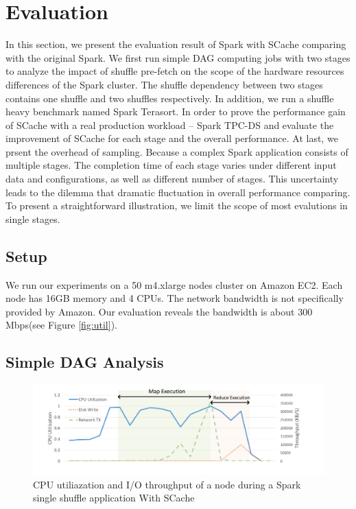 \section{Evaluation}\label{evaluation}

In this section, we present the evaluation result of Spark with SCache comparing with the original Spark. We first run simple DAG computing jobs with two stages to analyze the impact of shuffle pre-fetch on the scope of the hardware resources differences of the Spark cluster. The shuffle dependency between two stages contains one shuffle and two shuffles respectively. In addition, we run a shuffle heavy benchmark named Spark Terasort\cite{spark-tera}. In order to prove the performance gain of SCache with a real production workload -- Spark TPC-DS\cite{sparktpcds} and evaluate the improvement of SCache for each stage and the overall performance. At last, we prsent the overhead of sampling. Because a complex Spark application consists of multiple stages. The completion time of each stage varies under different input data and configurations, as well as different number of stages. This uncertainty leads to the dilemma that dramatic fluctuation in overall performance comparing. To present a straightforward illustration, we limit the scope of most evalutions in single stages. 

\subsection{Setup}\label{stepup}
We run our experiments on a 50 m4.xlarge nodes cluster on Amazon EC2\cite{aws}. Each node has 16GB memory and 4 CPUs. The network bandwidth is not specifically provided by Amazon. Our evaluation reveals the bandwidth is about 300 Mbps(see Figure \ref{fig:util}).

\subsection{Simple DAG Analysis}

\begin{figure}
	\includegraphics[width=\textwidth]{fig/scache_util}
	\caption{CPU utiliazation and I/O throughput of a node during a Spark single shuffle application With SCache}
	\label{fig:scache_util}
\end{figure}

